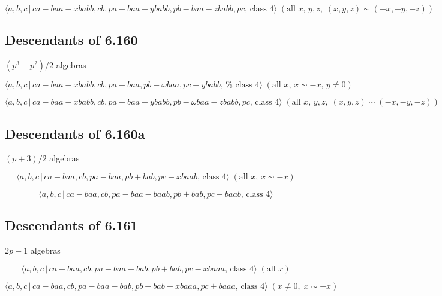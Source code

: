 \documentclass[10pt]{article}
\begin{document}
\begin{equation}
\langle a,b,c\,|\,ca-baa-xbabb,cb,pa-baa-ybabb,pb-baa-zbabb,pc,\,\text{class 
}4\rangle \;(\text{all }x,\,y,z,\;(x,y,z)\sim (-x,-y,-z))  \tag{7.1752}
\end{equation}

\subsection{Descendants of 6.160}

$(p^{3}+p^{2})/2$ algebras

\begin{equation}
\langle a,b,c\,|\,ca-baa-xbabb,cb,pa-baa,pb-\omega baa,pc-ybabb,\,\text{%
class }4\rangle \;(\text{all }x,\,x\sim -x,\,y\neq 0)  \tag{7.1753}
\end{equation}

\begin{equation}
\langle a,b,c\,|\,ca-baa-xbabb,cb,pa-baa-ybabb,pb-\omega baa-zbabb,pc,\,%
\text{class }4\rangle \;(\text{all }x,\,y,z,\;(x,y,z)\sim (-x,-y,-z)) 
\tag{7.1754}
\end{equation}

\subsection{Descendants of 6.160a}

$(p+3)/2$ algebras

\begin{equation}
\langle a,b,c\,|\,ca-baa,cb,pa-baa,pb+bab,pc-xbaab,\,\text{class }4\rangle
\;(\text{all }x,\,x\sim -x)  \tag{7.1755}
\end{equation}

\begin{equation}
\langle a,b,c\,|\,ca-baa,cb,pa-baa-baab,pb+bab,pc-baab,\,\text{class }%
4\rangle  \tag{7.1756}
\end{equation}

\subsection{Descendants of 6.161}

$2p-1$ algebras

\begin{equation}
\langle a,b,c\,|\,ca-baa,cb,pa-baa-bab,pb+bab,pc-xbaaa,\,\text{class }%
4\rangle \;(\text{all }x)  \tag{7.1757}
\end{equation}

\begin{equation}
\langle a,b,c\,|\,ca-baa,cb,pa-baa-bab,pb+bab-xbaaa,pc+baaa,\,\text{class }%
4\rangle \;(x\neq 0,\;x\sim -x)  \tag{7.1758}
\end{equation}
\end{document}
